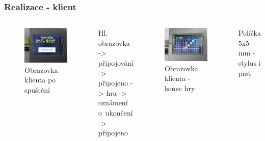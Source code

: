 \documentclass{beamer}
\begin{document}
\begin{frame}
\frametitle{Realizace - klient}
\begin{columns}[c]
	\begin{figure}
		\centering
		\includegraphics[width=\textwidth]{img/gameStart.jpg}
		\caption{Obrazovka klienta po spuštění}
	\end{figure}
	
	Hl. obrazovka -> připojování -> připojeno -> hra -> oznámení o~ukončení -> připojeno
	
%
 	\begin{figure}
		\centering
		\includegraphics[width= \textwidth]{img/gameEnd.jpg}
		\caption{Obrazovka klienta - konec hry}
	\end{figure}
	
	Políčka 5x5 mm - stylus i prst
	\vspace{.9cm}
 		
\end{columns}
\end{frame}
\end{document}

